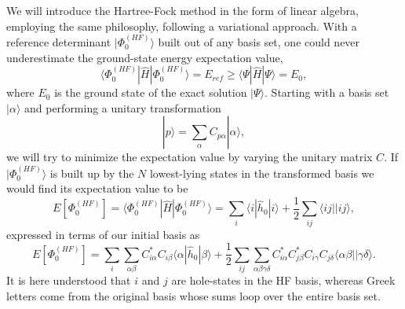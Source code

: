 We will introduce the Hartree-Fock method in the form of linear algebra, employing the same philosophy, following a variational approach.
With a reference determinant $|\Phi_0^{(HF)} \rangle$ built out of any basis set, one could never underestimate the ground-state energy expectation value, 
\begin{equation}
\langle \Phi_0^{(HF)} | \hat{H} | \Phi_0^{(HF)} \rangle = E_{ref} 
\geq 
\langle \Psi | \hat{H} | \Psi \rangle = E_0 ,
\end{equation}
where $E_0$ is the ground state of the exact solution $|\Psi\rangle$.
Starting with a basis set $|\alpha \rangle$ and performing a unitary transformation
\begin{equation}
| p \rangle = \sum_{\alpha} C_{p\alpha} |\alpha \rangle ,
\end{equation}
we will try to minimize the expectation value by varying the unitary matrix $C$.
If $|\Phi_0^{(HF)}\rangle $ is built up by the $N$ lowest-lying states in the transformed basis we would find its expectation value to be 
\begin{equation}
E\left[\Phi_0^{(HF)}\right] = \langle \Phi_0^{(HF)} | \hat{H} | \Phi_0^{(HF)} \rangle 
= 
\sum_i \langle i | \hat{h}_0 | i \rangle 
+
\frac{1}{2} \sum_{ij} \langle ij||ij\rangle ,
\end{equation}
expressed in terms of our initial basis as 
\begin{equation}
\label{eq:CC:hfEnergy}
E\left[\Phi_0^{(HF)}\right] 
=
\sum_i \sum_{\alpha \beta} C_{i\alpha}^{*} C_{i\beta} \langle \alpha | \hat{h}_0 | \beta \rangle 
+
\frac{1}{2} \sum_{ij} \sum_{\alpha \beta \gamma \delta}
 C_{i\alpha}^{*} C_{j\beta}^{*} C_{i\gamma} C_{j\delta} \langle \alpha \beta || \gamma \delta \rangle .
\end{equation}
It is here understood that $i$ and $j$ are hole-states in the HF basis, whereas Greek letters come from the original basis whose sums loop over the entire basis set.

